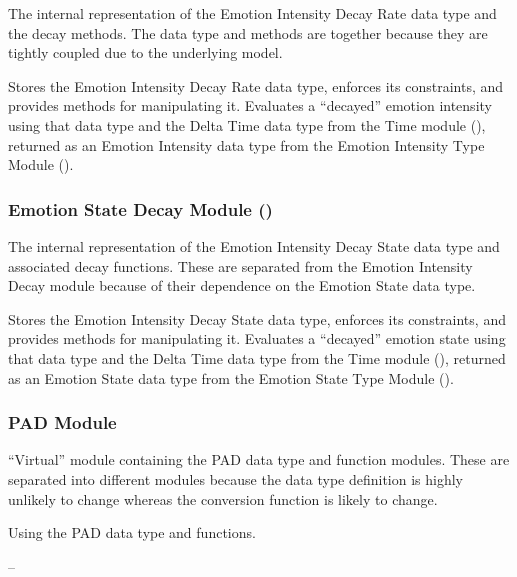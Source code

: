 \begin{description}[font=\scshape]
    \item[Secrets:] The internal representation of the Emotion Intensity Decay
    Rate data type and the decay methods. The data type and methods are together
    because they are tightly coupled due to the underlying model.

    \item[Services:] Stores the Emotion Intensity Decay Rate data type,
    enforces its constraints, and provides methods for manipulating it.
    Evaluates a ``decayed'' emotion intensity using that data type and the
    Delta Time data type from the Time module (), returned as an
    Emotion Intensity data type from the Emotion Intensity Type Module
    ().

    \item[Implemented By:] \progname{}
\end{description}

\subsubsection{Emotion State Decay Module ()}

\begin{description}[font=\scshape]
    \item[Secrets:] The internal representation of the Emotion Intensity Decay
    State data type and associated decay functions. These are separated from
    the Emotion Intensity Decay module because of their dependence on the
    Emotion State data type.

    \item[Services:] Stores the Emotion Intensity Decay State data type,
    enforces its constraints, and provides methods for manipulating it.
    Evaluates a ``decayed'' emotion state using that data type and the Delta
    Time data type from the Time module (), returned as an Emotion
    State data type from the Emotion State Type Module ().

    \item[Implemented By:] \progname{}
\end{description}

\subsubsection{PAD Module}

\begin{description}[font=\scshape]
    \item[Secrets:] ``Virtual'' module containing the PAD data type and
    function modules. These are separated into different modules because the
    data type definition is highly unlikely to change whereas the conversion
    function is likely to change.

    \item[Services:] Using the PAD data type and functions.

    \item[Implemented By:] --
\end{description}

